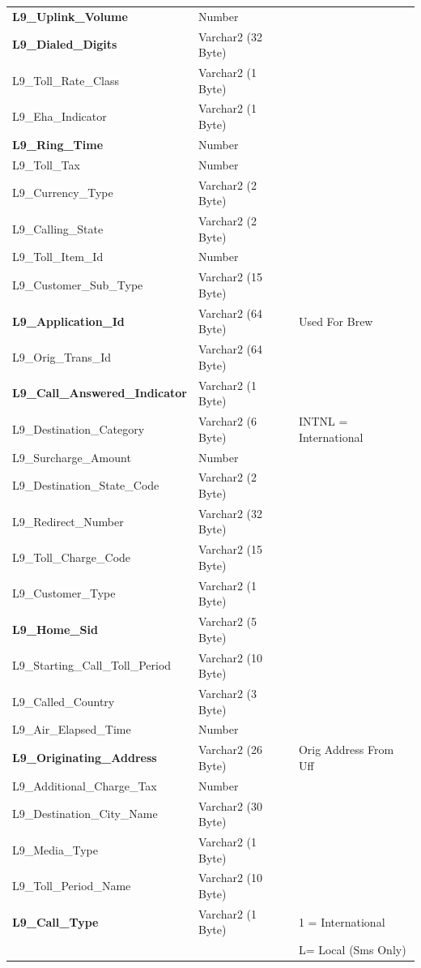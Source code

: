 \documentclass[12pt,twoside]{article}
\begin{document}
\begin{longtable}{l|l|l}
\textbf{L9\_Uplink\_Volume} & Number & \\
\textbf{L9\_Dialed\_Digits} & Varchar2 (32 Byte) & \\
L9\_Toll\_Rate\_Class & Varchar2 (1 Byte) & \\
L9\_Eha\_Indicator & Varchar2 (1 Byte) & \\
\textbf{L9\_Ring\_Time} & Number & \\
L9\_Toll\_Tax & Number & \\
L9\_Currency\_Type & Varchar2 (2 Byte) & \\
L9\_Calling\_State & Varchar2 (2 Byte) & \\
L9\_Toll\_Item\_Id & Number & \\
L9\_Customer\_Sub\_Type & Varchar2 (15 Byte) & \\
\textbf{L9\_Application\_Id} & Varchar2 (64 Byte) & Used For Brew\\
L9\_Orig\_Trans\_Id & Varchar2 (64 Byte) & \\
\textbf{L9\_Call\_Answered\_Indicator} & Varchar2 (1 Byte) & \\
L9\_Destination\_Category & Varchar2 (6 Byte) & INTNL = International\\
L9\_Surcharge\_Amount & Number & \\
L9\_Destination\_State\_Code & Varchar2 (2 Byte) & \\
L9\_Redirect\_Number & Varchar2 (32 Byte) & \\
L9\_Toll\_Charge\_Code & Varchar2 (15 Byte) & \\
L9\_Customer\_Type & Varchar2 (1 Byte) & \\
\textbf{L9\_Home\_Sid} & Varchar2 (5 Byte) & \\
L9\_Starting\_Call\_Toll\_Period & Varchar2 (10 Byte) & \\
L9\_Called\_Country & Varchar2 (3 Byte) & \\
L9\_Air\_Elapsed\_Time & Number & \\
\textbf{L9\_Originating\_Address} & Varchar2 (26 Byte) & Orig Address From Uff\\
L9\_Additional\_Charge\_Tax & Number & \\
L9\_Destination\_City\_Name & Varchar2 (30 Byte) & \\
L9\_Media\_Type & Varchar2 (1 Byte) & \\
L9\_Toll\_Period\_Name & Varchar2 (10 Byte) & \\
\textbf{L9\_Call\_Type} & Varchar2 (1 Byte) & 1 = International\\
 &  & L= Local (Sms Only)\\

\end{longtable}
\end{document}

